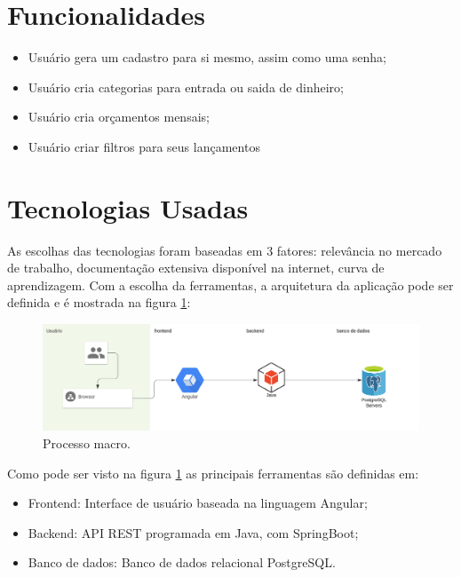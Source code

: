 \section{Funcionalidades}

\begin{itemize}
    \item Usuário gera um cadastro para si mesmo, assim como uma senha;
    \item Usuário cria categorias para entrada ou saida de dinheiro;
    \item Usuário cria orçamentos mensais;
    \item Usuário criar filtros para seus lançamentos
\end{itemize}

\section{Tecnologias Usadas}

As escolhas das tecnologias foram baseadas em 3 fatores: relevância no mercado de trabalho, documentação extensiva disponível na internet, curva de aprendizagem. Com a escolha da ferramentas, a arquitetura da aplicação pode ser definida e é mostrada na figura \ref{fig:process_macro}: 



\begin{figure}[htb]
	\caption{\label{fig:process_macro}Processo macro.}
	\begin{center}
		\includegraphics[scale=0.5]{images/processoMacro.png}
	\end{center}
\end{figure}

Como pode ser visto na figura \ref{fig:process_macro} as principais ferramentas são definidas em:

\begin{itemize}
    \item Frontend: Interface de usuário baseada na linguagem Angular;
    \item Backend: API REST programada em Java, com SpringBoot;
    \item Banco de dados: Banco de dados relacional PostgreSQL.
\end{itemize}


